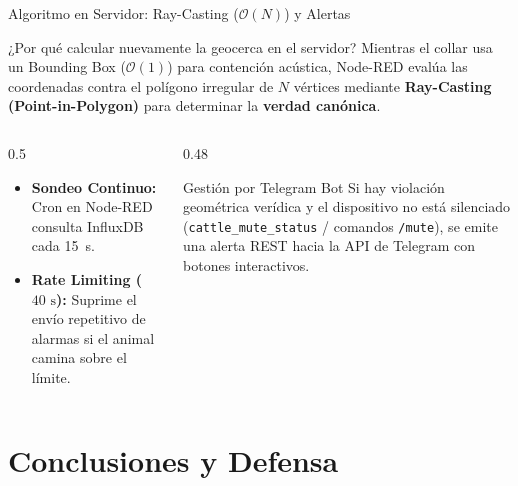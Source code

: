 \documentclass[aspectratio=43]{beamer}
\begin{document}
\begin{frame}{Algoritmo en Servidor: Ray-Casting ($\mathcal{O}(N)$) y Alertas}
    \begin{block}{¿Por qué calcular nuevamente la geocerca en el servidor?}
        \small
        Mientras el collar usa un Bounding Box ($\mathcal{O}(1)$) para contención acústica, Node-RED evalúa las coordenadas contra el polígono irregular de $N$ vértices mediante \textbf{Ray-Casting (Point-in-Polygon)} para determinar la \textbf{verdad canónica}.
    \end{block}

    \begin{columns}[T]
        \begin{column}{0.5\textwidth}
            \small
            \begin{itemize}
                \item \textbf{Sondeo Continuo:} Cron en Node-RED consulta InfluxDB cada 15~s.
                \item \textbf{Rate Limiting ($40\text{ s}$):} Suprime el envío repetitivo de alarmas si el animal camina sobre el límite.
            \end{itemize}
        \end{column}
        \begin{column}{0.48\textwidth}
            \begin{alertblock}{Gestión por Telegram Bot}
                \scriptsize
                Si hay violación geométrica verídica y el dispositivo no está silenciado (\texttt{cattle\_mute\_status} / comandos \texttt{/mute}), se emite una alerta REST hacia la API de Telegram con botones interactivos.
            \end{alertblock}
        \end{column}
    \end{columns}
\end{frame}

\section{Conclusiones y Defensa}
\end{document}
